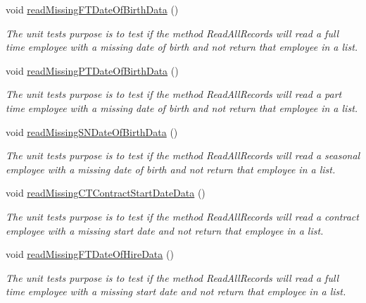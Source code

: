 \begin{DoxyCompactItemize}
void \hyperlink{class_file_i_o_tests_1_1_file_i_o_tests_a236bb0dfcf65b8e80eac0a430d3cbb4e}{read\+Missing\+F\+T\+Date\+Of\+Birth\+Data} ()
\begin{DoxyCompactList}\small\item\em The unit test\textquotesingle{}s purpose is to test if the method Read\+All\+Records will read a full time employee with a missing date of birth and not return that employee in a list. \end{DoxyCompactList}\item 
void \hyperlink{class_file_i_o_tests_1_1_file_i_o_tests_ab139efe1757f96627b927bee9e04124d}{read\+Missing\+P\+T\+Date\+Of\+Birth\+Data} ()
\begin{DoxyCompactList}\small\item\em The unit test\textquotesingle{}s purpose is to test if the method Read\+All\+Records will read a part time employee with a missing date of birth and not return that employee in a list. \end{DoxyCompactList}\item 
void \hyperlink{class_file_i_o_tests_1_1_file_i_o_tests_a4303821c3a0580cb900ccc11907db56c}{read\+Missing\+S\+N\+Date\+Of\+Birth\+Data} ()
\begin{DoxyCompactList}\small\item\em The unit test\textquotesingle{}s purpose is to test if the method Read\+All\+Records will read a seasonal employee with a missing date of birth and not return that employee in a list. \end{DoxyCompactList}\item 
void \hyperlink{class_file_i_o_tests_1_1_file_i_o_tests_aee32f8a08dac9bcaff47cbab3a75ab37}{read\+Missing\+C\+T\+Contract\+Start\+Date\+Data} ()
\begin{DoxyCompactList}\small\item\em The unit test\textquotesingle{}s purpose is to test if the method Read\+All\+Records will read a contract employee with a missing start date and not return that employee in a list. \end{DoxyCompactList}\item 
void \hyperlink{class_file_i_o_tests_1_1_file_i_o_tests_ad678ce357b215214cde943b45b11dd43}{read\+Missing\+F\+T\+Date\+Of\+Hire\+Data} ()
\begin{DoxyCompactList}\small\item\em The unit test\textquotesingle{}s purpose is to test if the method Read\+All\+Records will read a full time employee with a missing start date and not return that employee in a list. \end{DoxyCompactList}\item 

\end{DoxyCompactItemize}
